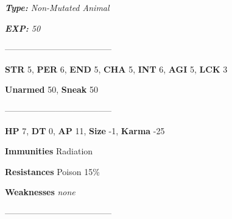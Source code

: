 \documentclass[11pt,a4paper,twocolumn]{book}
\begin{document}
	\noindent
	\emph{\textbf{Type:} Non-Mutated Animal}
	
	\noindent
	\emph{\textbf{EXP:} 50}
	
%		
%	
%		

	--------------------------------------

	\noindent
	\textbf{STR} 5, \textbf{PER} 6, \textbf{END} 5, \textbf{CHA} 5, \textbf{INT} 6, \textbf{AGI} 5, \textbf{LCK} 3
	
	\noindent
	\textbf{Unarmed} 50, \textbf{Sneak} 50
	
	--------------------------------------

	\noindent
	\textbf{HP} 7, \textbf{DT} 0, \textbf{AP} 11, \textbf{Size} -1, \textbf{Karma} -25
	
	
	\noindent
	\textbf{Immunities} Radiation
	
	\noindent
	\textbf{Resistances} Poison 15\%
	
	\noindent
	\textbf{Weaknesses} \emph{none} %
	
	--------------------------------------
	
\end{document}
